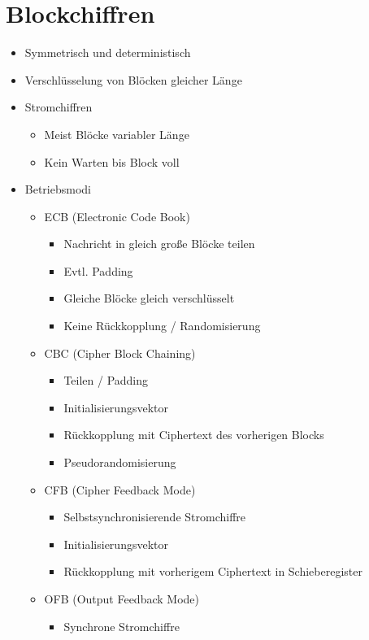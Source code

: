 \documentclass[11pt, paper=a4, twocolumn]{scrartcl}
\begin{document}
	\section{Blockchiffren}
		\begin{itemize}
			\item Symmetrisch und deterministisch
			\item Verschlüsselung von Blöcken gleicher Länge
			\item Stromchiffren
				\begin{itemize}
					\item Meist Blöcke variabler Länge
					\item Kein Warten bis Block voll
				\end{itemize}
			\item Betriebsmodi
				\begin{itemize}
					\item ECB (Electronic Code Book)
						\begin{itemize}
							\item Nachricht in 
								gleich große 
								Blöcke teilen
							\item Evtl. Padding
							\item Gleiche Blöcke gleich verschlüsselt
							\item Keine Rückkopplung / Randomisierung
						\end{itemize}
					\item CBC (Cipher Block Chaining)
						\begin{itemize}
							\item Teilen / Padding
							\item Initialisierungsvektor
							\item Rückkopplung mit Ciphertext des vorherigen Blocks
							\item Pseudorandomisierung
						\end{itemize}
					\item CFB (Cipher Feedback Mode)
						\begin{itemize}
							\item Selbstsynchronisierende Stromchiffre
							\item Initialisierungsvektor
							\item Rückkopplung mit vorherigem Ciphertext in Schieberegister
						\end{itemize}
					\item OFB (Output Feedback Mode)
						\begin{itemize}
							\item Synchrone Stromchiffre

\end{itemize}
\end{itemize}
\end{itemize}
\end{document}
